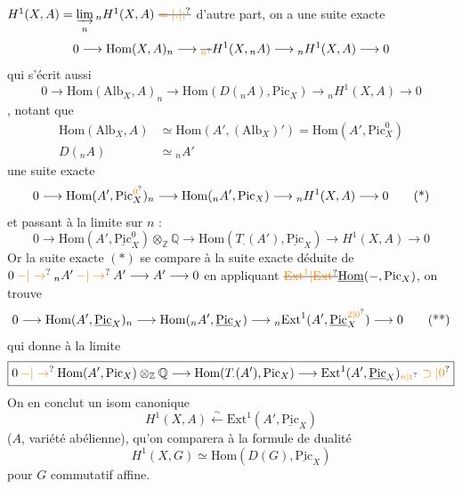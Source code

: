 $H^1(X,A)=\underset{n}{\underrightarrow{\lim}}\,{}_{n}H^1(X,A)\ \deleted{\unsure{=|.|;}}$ \enspace d'autre part, on a une suite exacte
\[
0\longrightarrow\mathrm{Hom}(X,A)_{n}\longrightarrow\deleted{{}_{\unsure{n}}}H^1(X,{}_{n}A)\longrightarrow{}_{n}H^1(X,A)\longrightarrow 0
\]
qui s'écrit aussi
\[
0\longrightarrow\mathrm{Hom}(\mathrm{Alb}_{X},A)_{n}\longrightarrow\mathrm{Hom}(D({}_{n}A),\mathrm{Pic}_{X})\longrightarrow{}_{n}H^1(X,A)\longrightarrow 0
\]
, notant que
\[
\begin{aligned}
\mathrm{Hom}(\mathrm{Alb}_{X},A)&\simeq\mathrm{Hom}(A',(\mathrm{Alb}_{X})')=\mathrm{Hom}(A',\mathrm{Pic}^{0}_{X})\\
D({}_{n}A)&\simeq{}_{n}A'
\end{aligned}
\]
une suite exacte
\makeatletter\tagsleft@true\makeatother
\[
0\longrightarrow\mathrm{Hom}(A',\mathrm{Pic}^{\unsure{0}}_{X})_{n}\longrightarrow\mathrm{Hom}({}_{n}A',\mathrm{Pic}_{X})\longrightarrow{}_{n}H^1(X,A)\longrightarrow0
\tag*{(*)}
\]
et passant à la limite  sur $n$ :
\[
\boxed{0\longrightarrow\mathrm{Hom}(A',\underline{\mathrm{Pic}}^{0}_{X})\otimes_{\mathbb Z}\mathbb Q\longrightarrow\mathrm{Hom}(T_{\cdot}(A'),\underline{\mathrm{Pic}}_{X})\longrightarrow H^1(X,A)\longrightarrow0}
\]
Or la suite exacte $(*)$ se compare à la suite exacte déduite de $0\mathbin{\unsure{-|\to}}{}_{n}A'\mathbin{\unsure{-|\to}} A'\longrightarrow A'\longrightarrow0$ en appliquant $\deleted{\unsure{\mathrm{Ext}^{1}|\mathrm{Ext}}}\underline{\mathrm{Hom}}(-,\mathrm{Pic}_{X})$, on trouve
\[
0\longrightarrow\mathrm{Hom}(A',\underline{\mathrm{Pic}}_{X})_{n}\longrightarrow\mathrm{Hom}({}_{n}A',\underline{\mathrm{Pic}}_{X})\longrightarrow{}_{n}\mathrm{Ext}^{1}(A',\underline{\mathrm{Pic}}^{\unsure{2|0}}_{X})\longrightarrow0
\tag*{(**)}
\]
qui donne à la limite
\[
\boxed{0\mathbin{\unsure{-|\to}}\mathrm{Hom}(A',\mathrm{Pic}_{X})\otimes_{\mathbb Z}\mathbb Q\longrightarrow\mathrm{Hom}(T_{\cdot}(A'),\mathrm{Pic}_{X})\longrightarrow\mathrm{Ext}^{1}(A',\underline{\mathrm{Pic}}_{X})_{\unsure{n|\mathrm{t}}}\ \unsure{\supset|0}}
\]
\makeatletter\tagsleft@false\makeatother
{}
On en conclut un isom canonique
\[
\boxed{H^1(X,A)\mathrel{\overset{\sim}{\longleftarrow}}\mathrm{Ext}^{1}(A',\underline{\mathrm{Pic}}_{X})}
\]
($A$, variété abélienne), qu'on comparera à la formule de dualité
\[
\boxed{H^1(X,G)\simeq\mathrm{Hom}(D(G),\underline{\mathrm{Pic}}_{X})}
\]
pour $G$ commutatif affine.


